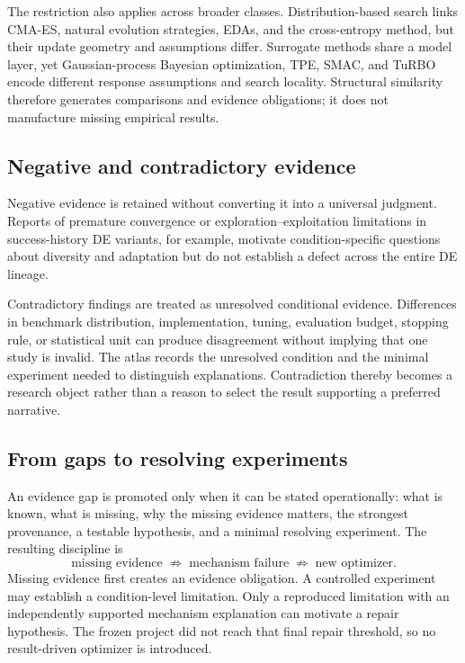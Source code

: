 The restriction also applies across broader classes. Distribution-based search links CMA-ES, natural evolution strategies, EDAs, and the cross-entropy method, but their update geometry and assumptions differ. Surrogate methods share a model layer, yet Gaussian-process Bayesian optimization, TPE, SMAC, and TuRBO encode different response assumptions and search locality. Structural similarity therefore generates comparisons and evidence obligations; it does not manufacture missing empirical results.

\subsection{Negative and contradictory evidence}

Negative evidence is retained without converting it into a universal judgment. Reports of premature convergence or exploration--exploitation limitations in success-history DE variants, for example, motivate condition-specific questions about diversity and adaptation but do not establish a defect across the entire DE lineage.

Contradictory findings are treated as unresolved conditional evidence. Differences in benchmark distribution, implementation, tuning, evaluation budget, stopping rule, or statistical unit can produce disagreement without implying that one study is invalid. The atlas records the unresolved condition and the minimal experiment needed to distinguish explanations. Contradiction thereby becomes a research object rather than a reason to select the result supporting a preferred narrative.

\subsection{From gaps to resolving experiments}

An evidence gap is promoted only when it can be stated operationally: what is known, what is missing, why the missing evidence matters, the strongest provenance, a testable hypothesis, and a minimal resolving experiment. The resulting discipline is
\begin{equation}
\text{missing evidence}\;\not\Rightarrow\;\text{mechanism failure}\;\not\Rightarrow\;\text{new optimizer}.
\label{eq:gap-discipline}
\end{equation}
Missing evidence first creates an evidence obligation. A controlled experiment may establish a condition-level limitation. Only a reproduced limitation with an independently supported mechanism explanation can motivate a repair hypothesis. The frozen project did not reach that final repair threshold, so no result-driven optimizer is introduced.

